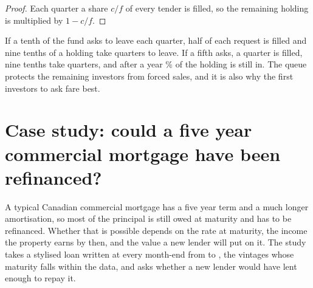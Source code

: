 \begin{chapterrefs}
\begin{proof}
Each quarter a share $c/f$ of every tender is filled, so the remaining holding is multiplied by
$1-c/f$.
\end{proof}

 If a tenth of the fund asks to leave each quarter, half of each request is filled and nine
tenths of a holding take \dlQuartersTen{} quarters to leave. If a fifth asks, a quarter is filled, nine
tenths take \dlQuartersTwenty{} quarters, and after a year \dlLeftFourTwenty\% of the holding is still in.
The queue protects the remaining investors from forced sales, and it is also why the first investors to
ask fare best.

\FloatBarrier
\section{Case study: could a five year commercial mortgage have been refinanced?}
\label{sec6:case}

 A typical Canadian commercial mortgage has a five year term and a much longer amortisation, so most
of the principal is still owed at maturity and has to be refinanced. Whether that is possible depends
on the rate at maturity, the income the property earns by then, and the value a new lender will put
on it. The study takes a stylised loan written at every month-end from \csFirst{} to \csLast, the
\csN{} vintages whose maturity falls within the data, and asks whether a new lender would have lent
enough to repay it.


\end{chapterrefs}
